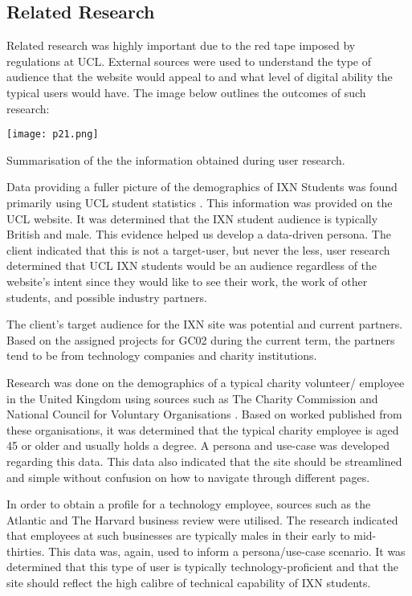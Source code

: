 \documentclass[fontsize=11pt]{extarticle}
\numberwithin{figure}{section} %
\begin{document}
\hypertarget{related-research}{%
\subsection{Related Research}\label{related-research}}

Related research was highly important due to the red tape imposed by
regulations at UCL. External sources were used to understand the type of
audience that the website would appeal to and what level of digital
ability the typical users would have. The image below outlines the
outcomes of such research:

\begin{table}[H]
      \centering
      \texttt{[image: p21.png]}
      \caption{Summarisation of the the information obtained during user research.}
 \end{table}

Data providing a fuller picture of the demographics of IXN Students was
found primarily using UCL student statistics \cite{ps1}. This
information was provided on the UCL website. It was determined that the
IXN student audience is typically British and male. This evidence helped
us develop a data-driven persona. The client indicated that this is not
a target-user, but never the less, user research determined that UCL IXN
students would be an audience regardless of the website's intent since
they would like to see their work, the work of other students, and
possible industry partners.

The client's target audience for the IXN site was potential and current
partners. Based on the assigned projects for GC02 during the current
term, the partners tend to be from technology companies and charity
institutions.

Research was done on the demographics of a typical charity volunteer/
employee in the United Kingdom using sources such as The Charity
Commission \cite{ps2} and National Council for Voluntary Organisations
\cite{ps3}. Based on worked published from these organisations, it was
determined that the typical charity employee is aged 45 or older and
usually holds a degree. A persona and use-case was developed regarding
this data. This data also indicated that the site should be streamlined
and simple without confusion on how to navigate through different pages.

In order to obtain a profile for a technology employee, sources such as
the Atlantic \cite{ps4} and The Harvard business review \cite{ps5} were
utilised. The research indicated that employees at such businesses are
typically males in their early to mid-thirties. This data was, again,
used to inform a persona/use-case scenario. It was determined that this
type of user is typically technology-proficient and that the site should
reflect the high calibre of technical capability of IXN students.
\end{document}
